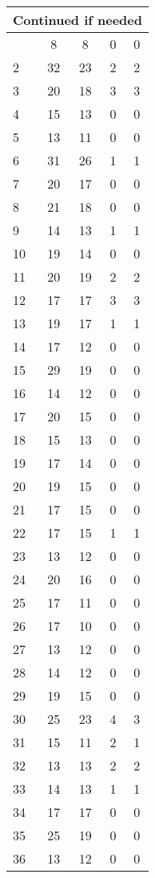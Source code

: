 \begin{center}
\begin{longtable}{l|c|c|c|c}
\hline \multicolumn{5}{|r|}{{Continued if needed}} \\ \hline
\endfoot 
1 & 8 & 8 & 0 & 0\\ \hline
2 & 32 & 23 & 2 & 2\\ \hline
3 & 20 & 18 & 3 & 3\\ \hline
4 & 15 & 13 & 0 & 0\\ \hline
5 & 13 & 11 & 0 & 0\\ \hline
6 & 31 & 26 & 1 & 1\\ \hline
7 & 20 & 17 & 0 & 0\\ \hline
8 & 21 & 18 & 0 & 0\\ \hline
9 & 14 & 13 & 1 & 1\\ \hline
10 & 19 & 14 & 0 & 0\\ \hline
11 & 20 & 19 & 2 & 2\\ \hline
12 & 17 & 17 & 3 & 3\\ \hline
13 & 19 & 17 & 1 & 1\\ \hline
14 & 17 & 12 & 0 & 0\\ \hline
15 & 29 & 19 & 0 & 0\\ \hline
16 & 14 & 12 & 0 & 0\\ \hline
17 & 20 & 15 & 0 & 0\\ \hline
18 & 15 & 13 & 0 & 0\\ \hline
19 & 17 & 14 & 0 & 0\\ \hline
20 & 19 & 15 & 0 & 0\\ \hline
21 & 17 & 15 & 0 & 0\\ \hline
22 & 17 & 15 & 1 & 1\\ \hline
23 & 13 & 12 & 0 & 0\\ \hline
24 & 20 & 16 & 0 & 0\\ \hline
25 & 17 & 11 & 0 & 0\\ \hline
26 & 17 & 10 & 0 & 0\\ \hline
27 & 13 & 12 & 0 & 0\\ \hline
28 & 14 & 12 & 0 & 0\\ \hline
29 & 19 & 15 & 0 & 0\\ \hline
30 & 25 & 23 & 4 & 3\\ \hline
31 & 15 & 11 & 2 & 1\\ \hline
32 & 13 & 13 & 2 & 2\\ \hline
33 & 14 & 13 & 1 & 1\\ \hline
34 & 17 & 17 & 0 & 0\\ \hline
35 & 25 & 19 & 0 & 0\\ \hline
36 & 13 & 12 & 0 & 0\\ \hline

\end{longtable}
\end{center}
